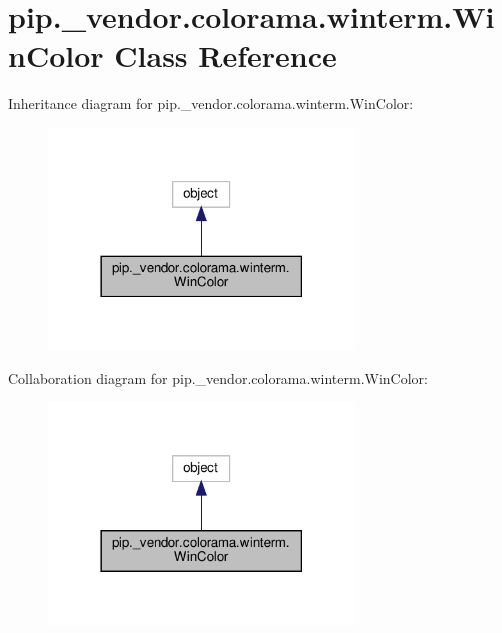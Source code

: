 \hypertarget{classpip_1_1__vendor_1_1colorama_1_1winterm_1_1WinColor}{}\section{pip.\+\_\+vendor.\+colorama.\+winterm.\+Win\+Color Class Reference}
\label{classpip_1_1__vendor_1_1colorama_1_1winterm_1_1WinColor}


Inheritance diagram for pip.\+\_\+vendor.\+colorama.\+winterm.\+Win\+Color\+:
\nopagebreak
\begin{figure}[H]
\begin{center}
\leavevmode
\includegraphics[width=230pt]{classpip_1_1__vendor_1_1colorama_1_1winterm_1_1WinColor__inherit__graph}
\end{center}
\end{figure}


Collaboration diagram for pip.\+\_\+vendor.\+colorama.\+winterm.\+Win\+Color\+:
\nopagebreak
\begin{figure}[H]
\begin{center}
\leavevmode
\includegraphics[width=230pt]{classpip_1_1__vendor_1_1colorama_1_1winterm_1_1WinColor__coll__graph}
\end{center}
\end{figure}

